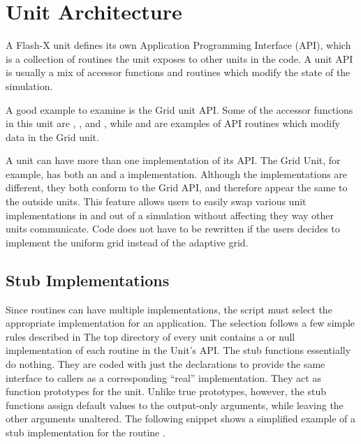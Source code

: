 \section{Unit Architecture}
\label{Sec:Unit Architecture}

A Flash-X unit defines its own Application Programming Interface (API),
which is a collection of routines the unit exposes to other units in 
the code.  A unit API is usually a mix of accessor functions and
routines which modify the state of the simulation.

A good example to examine is the \unit{Grid} unit API. Some of the accessor
functions in this unit are ,
, and , 
while  and
\newline   %
 are examples of API routines which
modify data in the \unit{Grid} unit.

A unit can have more than one implementation of its API.  The
\unit{Grid} Unit, for example, has both an  and a
 implementation.  Although the implementations are
different, they both conform to the \unit{Grid} API, and therefore appear the
same to the outside units.  This feature allows users to easily swap 
various unit implementations in and out of a simulation without
affecting they way other units communicate.  Code does not have to be
rewritten if the users decides to implement the uniform grid instead
of the adaptive grid.  

\subsection{Stub Implementations}
Since routines can have multiple implementations, the  script
must select the appropriate implementation for an application.
The selection follows a few simple rules described in
The top directory of every unit
contains a  or null implementation of each routine in the
Unit's API.  The stub functions essentially do nothing. They are coded
with just the declarations to provide the same interface to callers as
a corresponding ``real'' implementation. They act as function
prototypes for the unit. Unlike true prototypes, however,
the stub functions assign default values to the
output-only arguments, while leaving the other arguments
unaltered. The following snippet shows a simplified example of a stub
implementation for the routine .


